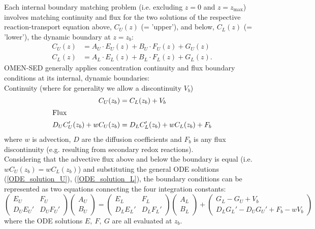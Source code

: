 \documentclass[gmd, manuscript]{copernicus}
\begin{document}
Each internal boundary matching problem (i.e. excluding $z=0$ and $z=z_\mathrm{max}$) involves matching continuity and flux for the two solutions of the respective 
reaction-transport equation above, $C_U(z)$ (= 'upper'), and below, $C_L(z)$ (= 'lower'), the dynamic boundary at $z = z_b$:
\begin{align}
C_U(z) &= A_U \cdot E_U(z) + B_U \cdot F_U(z) + G_U(z) \label{ODE_solution_U}\\
C_L(z) &= A_L \cdot E_L(z) + B_L \cdot F_L(z) + G_L(z) .\label{ODE_solution_L}
\end{align}
OMEN-SED generally applies concentration continuity and flux boundary conditions at its internal, dynamic boundaries: \\
Continuity (where for generality we allow a discontinuity $V_b$) 
\begin{align}
  C_U(z_b) &= C_L(z_b) + V_b	\\
\intertext{Flux}
 D_U C_U'(z_b) + wC_U(z_b) &=  D_LC_L'(z_b) + wC_L(z_b) + F_b
\end{align}
where $w$ is advection, $D$ are the diffusion coefficients and $F_b$ is any flux discontinuity (e.g. resulting from secondary redox reactions).\\[1em]
Considering that the advective flux above and below the boundary is equal (i.e. $wC_U(z_b) = wC_L(z_b)$) and substituting the general ODE solutions (\ref{ODE_solution_U}), (\ref{ODE_solution_L}), 
the boundary conditions can be represented as two equations connecting the four integration constants:
\begin{equation}
 \begin{pmatrix} E_U & F_U \\ D_UE_U' & D_UF_U' \end{pmatrix} \begin{pmatrix} A_U \\ B_U \end{pmatrix} = \begin{pmatrix} E_L & F_L \\ D_LE_L' & D_LF_L' \end{pmatrix} \begin{pmatrix} A_L \\ B_L \end{pmatrix} 
 + \begin{pmatrix} G_L - G_U + V_b \\ D_LG_L' - D_UG_U' + F_b - wV_b\end{pmatrix} \label{Solution_BC}
\end{equation}
where the ODE solutions $E,\ F,\ G$ are all evaluated at $z_b$.\\[1em]
\end{document}
